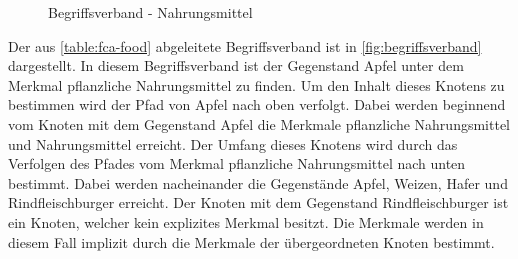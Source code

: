 \begin{figure}[!ht]
    \centering
    \caption{\label{fig:begriffsverband}Begriffsverband - Nahrungsmittel}
\end{figure}

Der aus \autoref{table:fca-food} abgeleitete Begriffsverband ist in \autoref{fig:begriffsverband} dargestellt. 
In diesem Begriffsverband ist der Gegenstand Apfel unter dem Merkmal pflanzliche Nahrungsmittel zu finden.
Um den Inhalt dieses Knotens zu bestimmen wird der Pfad von Apfel nach oben verfolgt.
Dabei werden beginnend vom Knoten mit dem Gegenstand Apfel die Merkmale pflanzliche Nahrungsmittel und Nahrungsmittel erreicht.
Der Umfang dieses Knotens wird durch das Verfolgen des Pfades vom Merkmal pflanzliche Nahrungsmittel nach unten bestimmt.
Dabei werden nacheinander die Gegenstände Apfel, Weizen, Hafer und Rindfleischburger erreicht.
Der Knoten mit dem Gegenstand Rindfleischburger ist ein Knoten, welcher kein explizites Merkmal besitzt.
Die Merkmale werden in diesem Fall implizit durch die Merkmale der übergeordneten Knoten bestimmt. \\
